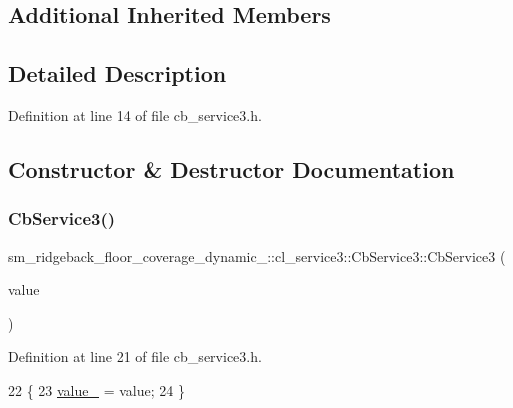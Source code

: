 \subsection*{Additional Inherited Members}


\subsection{Detailed Description}


Definition at line 14 of file cb\+\_\+service3.\+h.



\subsection{Constructor \& Destructor Documentation}
\mbox{\label{classsm__ridgeback__floor__coverage__dynamic__1_1_1cl__service3_1_1CbService3_a6b9bf2e5fa733fe3e1f5e9df7cf5bc94}} 
\subsubsection{\texorpdfstring{Cb\+Service3()}{CbService3()}}
{\footnotesize\ttfamily sm\+\_\+ridgeback\+\_\+floor\+\_\+coverage\+\_\+dynamic\+\_\+::cl\+\_\+service3\+::\+Cb\+Service3\+::\+Cb\+Service3 (\begin{DoxyParamCaption}\item[{\hyperlink{namespacesm__ridgeback__floor__coverage__dynamic__1_1_1cl__service3_a44063f74ff3bc29b2e2e09b19416e604}{Service3\+Command}}]{value }\end{DoxyParamCaption})\hspace{0.3cm}{\ttfamily [inline]}}



Definition at line 21 of file cb\+\_\+service3.\+h.


\begin{DoxyCode}
22   \{
23     \hyperlink{classsm__ridgeback__floor__coverage__dynamic__1_1_1cl__service3_1_1CbService3_a2ef778d30aaafb2171697f39a1d42402}{value\_} = value;
24   \}
\end{DoxyCode}


